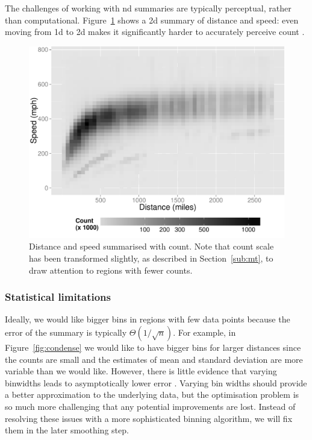 \documentclass[journal]{vgtc}                %
\begin{document}
The challenges of working with nd summaries are typically perceptual, rather than computational. Figure~\ref{fig:condense-2d} shows a 2d summary of distance and speed: even moving from 1d to 2d makes it significantly harder to accurately perceive count \citep{cleveland:1984}.

\begin{figure}[htb]
 \centering
 \includegraphics[width=\linewidth]{condense-2d}
 \caption{Distance and speed summarised with count. Note that count scale has been transformed slightly, as described in Section~\ref{sub:mt}, to draw attention to regions with fewer counts.}
 \label{fig:condense-2d}
\end{figure}

\subsubsection{Statistical limitations}

Ideally, we would like bigger bins in regions with few data points because the error of the summary is typically $\Theta(1 / \sqrt{n})$. For example, in Figure~\ref{fig:condense} we would like to have bigger bins for larger distances since the counts are small and the estimates of mean and standard deviation are more variable than we would like. However, there is little evidence that varying binwidths leads to asymptotically lower error \citep{terrell:1992}. Varying bin widths should provide a better approximation to the underlying data, but the optimisation problem is so much more challenging that any potential improvements are lost. Instead of resolving these issues with a more sophisticated binning algorithm, we will fix them in the later smoothing step.  
\end{document}
